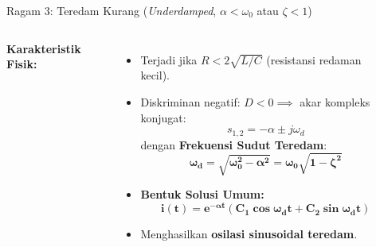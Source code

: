 \documentclass[aspectratio=169,10pt]{beamer}
\begin{document}
\begin{frame}{Ragam 3: Teredam Kurang (\textit{Underdamped}, $\alpha < \omega_0$ atau $\zeta < 1$)}
  \begin{columns}[c]
    \textbf{Karakteristik Fisik:}
    \begin{itemize}
      \item Terjadi jika $R < 2\sqrt{L/C}$ (resistansi redaman kecil).
      \item Diskriminan negatif: $D < 0 \implies$ akar kompleks konjugat:
      \begin{equation*}
        s_{1,2} = -\alpha \pm j \omega_d
      \end{equation*}
      dengan \textbf{Frekuensi Sudut Teredam}:
      \begin{equation*}
        \mathbf{\omega_d = \sqrt{\omega_0^2 - \alpha^2} = \omega_0 \sqrt{1 - \zeta^2}}
      \end{equation*}
      \item \textbf{Bentuk Solusi Umum:}
      \begin{equation*}
        \mathbf{i(t) = e^{-\alpha t} (C_1 \cos\omega_d t + C_2 \sin\omega_d t)}
      \end{equation*}
      \item Menghasilkan \textbf{osilasi sinusoidal teredam}.
    \end{itemize}

    \begin{center}
    \end{center}
  \end{columns}
\end{frame}
\end{document}
